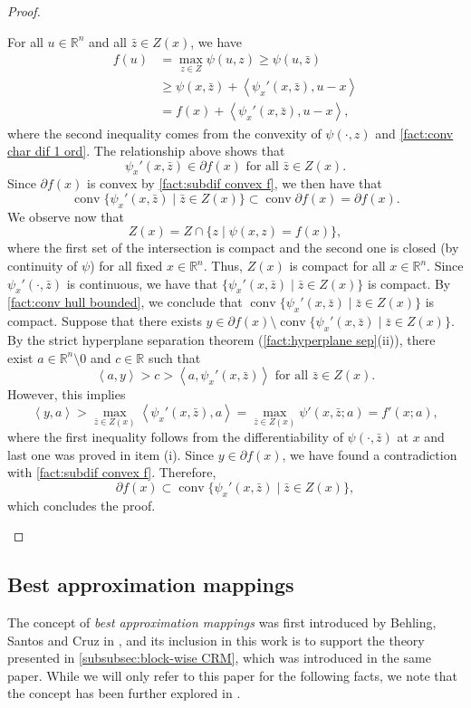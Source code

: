 \documentclass[smallextended,numbook,nospthms]{svjour3}
\theoremstyle{plain}
\theoremstyle{definition}
\def\RR{\mathds R}
\newcommand{\scal}[2]{\left\langle{#1},{#2}  \right\rangle}
\begin{document}
\begin{proof}
\begin{listi}
		\item For all $u \in \RR^n$ and all $\bar{z} \in Z(x)$, we have
		\begin{align}
			f(u) &= \max_{z \in Z} \psi (u,z) \geq \psi(u,\bar{z}) \\
				&\geq \psi(x,\bar{z}) + \scal{\psi_{x}'(x,\bar{z})}{u-x} \\
				&= f(x) + \scal{\psi_{x}'(x,\bar{z})}{u-x},
		\end{align}
		where the second inequality comes from the convexity of $\psi(\cdot,z)$ and \cref{fact:conv char dif 1 ord}. The relationship above shows that
		\[
		\psi_{x}'(x,\bar{z}) \in \partial f(x) \text{ for all } \bar{z} \in Z(x).
		\]
		Since $\partial f(x)$ is convex by \cref{fact:subdif convex f}, we then have that
		\[
		\operatorname{conv} \{\psi_{x}'(x,\bar{z}) \mid \bar{z} \in Z(x) \} \subset \operatorname{conv} \partial f(x) = \partial f(x).
		\]
		We observe now that
		\[
		Z(x)=Z\cap \{z \mid \psi(x,z)=f(x)\},
		\]
		where the first set of the intersection is compact and the second one is closed (by continuity of $\psi$) for all fixed $x \in \RR^n$. Thus, $Z(x)$ is compact for all $x \in \RR^n$. Since $\psi_{x}'(\cdot,\bar{z})$ is continuous, we have that $\{\psi_{x}'(x,\bar{z}) \mid \bar{z} \in Z(x) \}$ is compact. By \cref{fact:conv hull bounded}, we conclude that $\operatorname{conv} \{\psi_{x}'(x,\bar{z}) \mid \bar{z} \in Z(x)\}$ is compact. Suppose that there exists $y \in \partial f(x) \setminus \operatorname{conv} \{\psi_{x}'(x,\bar{z}) \mid \bar{z} \in Z(x)\}$.
		By the strict hyperplane separation theorem (\cref{fact:hyperplane sep}(ii)), there exist $a \in \RR^n \setminus {0}$ and $c \in \RR$ such that
		\[
		\scal{a}{y} > c > \scal{a}{\psi_{x}'(x,\bar{z})} \text{ for all } \bar{z} \in Z(x).
		\]
		However, this implies
		\[
		\scal{y}{a} > \max_{\bar{z} \in Z(x)}\scal{\psi_{x}'(x,\bar{z})}{a} = \max_{\bar{z} \in Z(x)} \psi'(x,\bar{z};a)=f'(x;a),
		\]
		where the first inequality follows from the differentiability of $\psi(\cdot,\bar{z})$ at $x$ and last one was proved in item (i). Since $y \in \partial f(x)$, we have found a contradiction with \cref{fact:subdif convex f}. Therefore,
		\[
		\partial f(x) \subset \operatorname{conv} \{\psi_{x}'(x,\bar{z}) \mid \bar{z} \in Z(x)\},
		\]
		which concludes the proof.
	\end{listi}
\end{proof}
\subsection{Best approximation mappings}\label{subsec:BAM}
The concept of \emph{best approximation mappings} was first introduced by Behling, Santos and Cruz in \cite{Behling:2019dj}, and its inclusion in this work is to support the theory presented in \cref{subsubsec:block-wise CRM}, which was introduced in the same paper. While we will only refer to this paper for the following facts, we note that the concept has been further explored in \cite{Bauschke:2020}.
\end{document}
